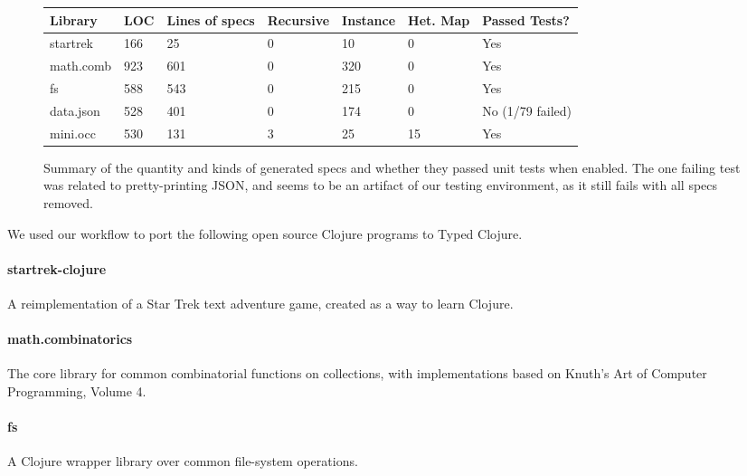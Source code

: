 \begin{figure*}
\begin{tabular}
{|         l   || l   | l || l  | l  | l || l |}
  Library       & LOC  &  Lines of specs  & Recursive & Instance & Het. Map & Passed Tests?\\ 
  \hline
  \hline
  startrek      & 166  &  25  & 0  & 10   & 0  & Yes\\
  math.comb     & 923  &  601 & 0  & 320  & 0  & Yes\\
  fs            & 588  &  543 & 0  & 215  & 0  & Yes\\
  data.json     & 528  &  401 & 0  & 174  & 0  & No (1/79 failed)\\ %
  mini.occ      & 530  &  131 & 3  & 25   & 15 & Yes\\
\end{tabular}
  \caption{Summary of the quantity and kinds of generated specs and whether they passed
  unit tests when enabled.
  The one failing test was related to pretty-printing JSON, and seems to be an artifact
  of our testing environment, as it still fails with all specs removed.
  }
\label{infer:fig:genspec}
\end{figure*}

\label{infer:sec:experiment2}

We used our workflow to port the following open source Clojure programs to Typed Clojure.

\paragraph{startrek-clojure}
A reimplementation of a Star Trek text adventure game,
created as a way to learn Clojure.

\paragraph{math.combinatorics}
The core library for common combinatorial functions
on collections,
with implementations based on Knuth's Art of Computer
Programming, Volume 4.

\paragraph{fs}
A Clojure wrapper library over common file-system operations.

